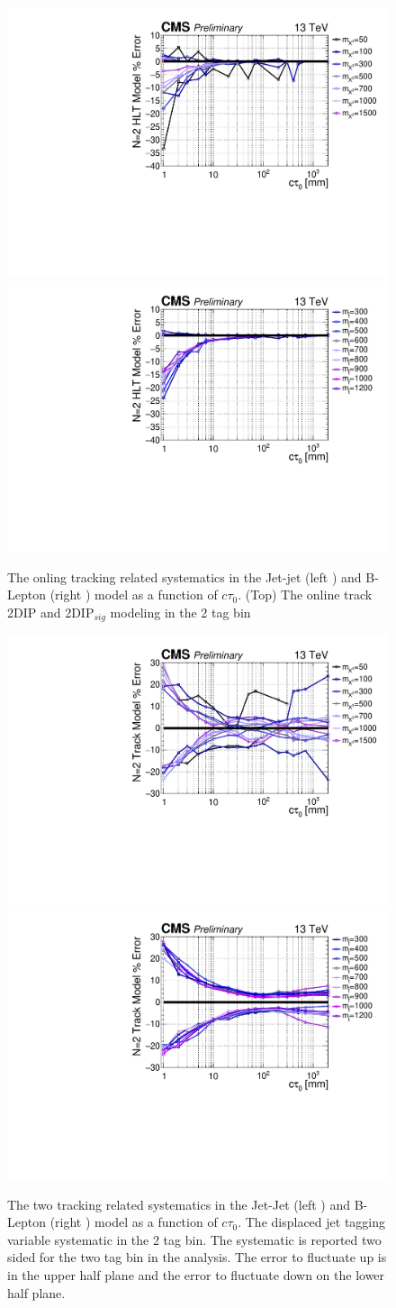 \begin{figure}
\begin{center}
\includegraphics[width=.45\textwidth]{figures/an/SYSTEMATICS/76x_pu/sys_2tag_hlt.pdf}
\includegraphics[width=.45\textwidth]{figures/an/SYSTEMATICS/76x_pu/sys_2tag_hlt_dsusy.pdf}
\caption{The onling tracking related systematics in the Jet-jet (left ) and B-Lepton
 (right )  model as a function of $c\tau_0$. (Top) The online track 2DIP and
 2DIP$_{sig}$ modeling in the 2 tag bin   \label{fig:online_tracking_sys}}
\end{center}
\end{figure}

\begin{figure}
\begin{center}
\includegraphics[width=.45\textwidth]{figures/an/SYSTEMATICS/76x_pu/sys_2tag_tracking.pdf}
\includegraphics[width=.45\textwidth]{figures/an/SYSTEMATICS/76x_pu/sys_2tag_tracking_dsusy.pdf}
\caption{The two tracking related systematics in the Jet-Jet (left ) and B-Lepton
 (right )  model as a function of $c\tau_0$.  The displaced jet tagging variable 
systematic in the 2 tag bin. The systematic is reported two sided for the two tag
 bin in the analysis. The error to fluctuate up is in the upper half plane and the
 error to fluctuate down on the lower half plane.  \label{fig:offline_tracking_sys}}
\end{center}
\end{figure}

